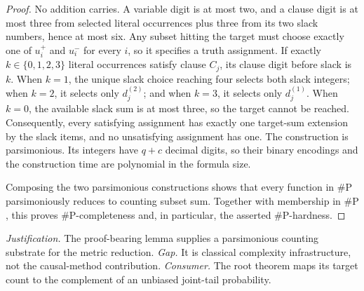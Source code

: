 \documentclass{article}
\begin{document}
\begin{proof}
No addition carries. A variable digit is at most two, and a clause digit is at most three from selected literal occurrences plus three from its two slack numbers, hence at most six. Any subset hitting the target must choose exactly one of \(u_i^+\) and \(u_i^-\) for every \(i\), so it specifies a truth assignment. If exactly \(k\in\{0,1,2,3\}\) literal occurrences satisfy clause \(C_j\), its clause digit before slack is \(k\). When \(k=1\), the unique slack choice reaching four selects both slack integers; when \(k=2\), it selects only \(d_j^{(2)}\); and when \(k=3\), it selects only \(d_j^{(1)}\). When \(k=0\), the available slack sum is at most three, so the target cannot be reached. Consequently, every satisfying assignment has exactly one target-sum extension by the slack items, and no unsatisfying assignment has one. The construction is parsimonious. Its integers have \(q+c\) decimal digits, so their binary encodings and the construction time are polynomial in the formula size.

Composing the two parsimonious constructions shows that every function in \(\#\mathrm P\) parsimoniously reduces to counting subset sum. Together with membership in \(\#\mathrm P\), this proves \(\#\mathrm P\)-completeness and, in particular, the asserted \(\#\mathrm P\)-hardness.
\end{proof}
\par\smallskip\noindent \textit{Justification.} The proof-bearing lemma supplies a parsimonious counting substrate for the metric reduction. \textit{Gap.} It is classical complexity infrastructure, not the causal-method contribution. \textit{Consumer.} The root theorem maps its target count to the complement of an unbiased joint-tail probability.
\end{document}
